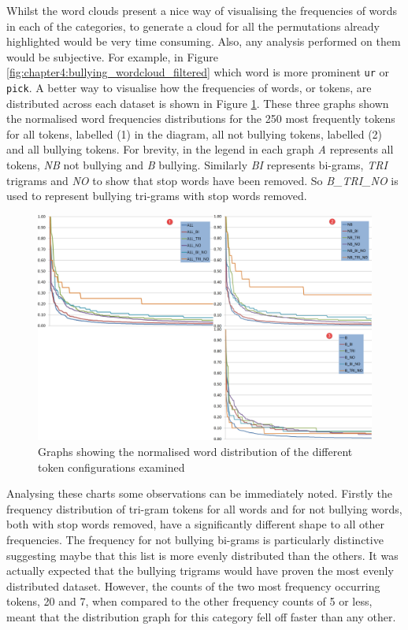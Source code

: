 Whilst the word clouds present a nice way of visualising the frequencies of words in each of the categories, to generate a cloud for all the permutations already highlighted would be very time consuming. Also, any analysis performed on them would be subjective. For example, in Figure \ref{fig:chapter4:bullying_wordcloud_filtered} which word is more prominent \verb|ur| or \verb|pick|. A better way to visualise how the frequencies of words, or tokens, are distributed across each dataset is shown in Figure \ref{fig:chapter4:word_frequencies}. These three graphs shown the normalised word frequencies distributions for the 250 most frequently tokens for all tokens, labelled (1) in the diagram, all not bullying tokens, labelled (2) and all bullying tokens. For brevity, in the legend in each graph \textit{A} represents all tokens, \textit{NB} not bullying and \textit{B} bullying. Similarly \textit{BI} represents bi-grams, \textit{TRI} trigrams and \textit{NO} to show that stop words have been removed. So \textit{B\_TRI\_NO} is used to represent bullying tri-grams with stop words removed.



\begin{figure}[!htb]
	\centering
	\includegraphics[width=1.0\textwidth]{Figures/Chapter4/word_frequencies.jpg}
	\caption[Normalised distribution of word frequencies]{Graphs showing the normalised word distribution of the different token configurations examined}
	\label{fig:chapter4:word_frequencies}
\end{figure}

Analysing these charts some observations can be immediately noted. Firstly the frequency distribution of tri-gram tokens for all words and for not bullying words, both with stop words removed, have a significantly different shape to all other frequencies. The frequency for not bullying bi-grams is particularly distinctive suggesting maybe that this list is more evenly distributed than the others. It was actually expected that the bullying trigrams would have proven the most evenly distributed dataset. However, the counts of the two most frequency occurring tokens, 20 and 7, when compared to the other frequency counts of 5 or less, meant that the distribution graph for this category fell off faster than any other.



